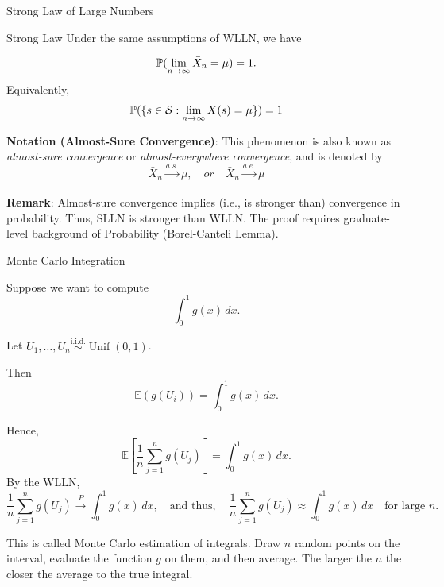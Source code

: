 \begin{frame}{Strong Law of Large Numbers}
\begin{keybox}{Strong Law}
Under the same assumptions of WLLN, we have

\begin{equation*}
    \mathbb{P}({\lim_{n\to \infty} \bar X_n = \mu}) =1.
\end{equation*}
Equivalently, 
\begin{equation*}
    \mathbb{P}(\{ s\in \mathcal{S} : \lim_{n\to \infty}X(s)=\mu \})=1
\end{equation*}

\end{keybox}

\textbf{Notation (Almost-Sure Convergence)}: This phenomenon is also known as \textit{almost-sure convergence} or \textit{almost-everywhere convergence}, and is denoted by
\begin{equation*}
    \bar X_n \xrightarrow[]{a.s.}\mu, \quad or \quad \bar X_n \xrightarrow[]{a.e.}\mu
\end{equation*}

\textbf{Remark}: Almost-sure convergence implies (i.e., is stronger than) convergence in probability. Thus, SLLN is stronger than WLLN. The proof requires graduate-level background of Probability (Borel-Canteli Lemma).


\end{frame}

\begin{frame}{Monte Carlo Integration}

Suppose we want to compute
\[
\int_0^1 g(x)\,dx.
\]

Let
$U_1,\dots,U_n
\overset{\text{i.i.d.}}{\sim}
\operatorname{Unif}(0,1)$.

Then
\[
\mathbb{E}(g(U_i))
=
\int_0^1 g(x)\,dx.
\]

Hence,
\[
\mathbb{E}[\frac1n
\sum_{j=1}^n g(U_j)]= \int_0^1 g(x)\,dx.
\]
By the WLLN,
\[
\boxed{
\frac1n
\sum_{j=1}^n g(U_j)
\xrightarrow[]{P}
\int_0^1 g(x)\,dx, \quad \text{and thus},\quad   \frac1n
\sum_{j=1}^n g(U_j)
\approx
\int_0^1 g(x)\,dx
\quad
\text{for large } n.
}
\]

This is called Monte Carlo estimation of integrals. Draw $n$ random points on the interval, evaluate the function $g$ on them, and then average. The larger the $n$ the closer the average to the true integral.

\end{frame}



